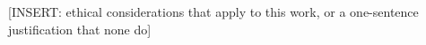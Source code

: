 [INSERT: ethical considerations that apply to this work, or a one-sentence justification that none do]
